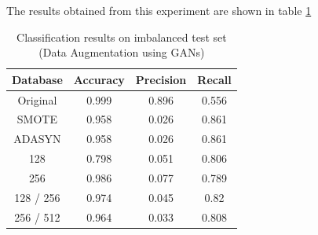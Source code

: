 The results obtained from this experiment are shown in table \ref{tab:Classification results on imbalanced test set (Data Augmentation using GANs)}
\begin{table}[H]
    \centering
    \begin{tabular}{|c|c|c|c|}
         \hline
         Database
         & Accuracy
         & Precision 
         & Recall \\
         \hline
         Original & 0.999 & 0.896 & 0.556\\
         SMOTE & 0.958 & 0.026 & 0.861 \\
         ADASYN & 0.958 & 0.026 & 0.861 \\
         128 & 0.798 & 0.051 & 0.806 \\
         256 & 0.986 & 0.077 & 0.789 \\
         128 / 256 & 0.974 & 0.045 & 0.82 \\
         256 / 512 & 0.964 & 0.033 & 0.808\\
         \hline
    \end{tabular}
    \caption{Classification results on imbalanced test set (Data Augmentation using GANs)\cite{litReviewGanDataAugmentation}}
    \label{tab:Classification results on imbalanced test set (Data Augmentation using GANs)}
\end{table}

